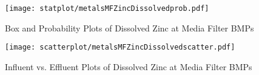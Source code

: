         \begin{figure}[hb]   %
            \centering
            \texttt{[image: statplot/metalsMFZincDissolvedprob.pdf]}
            \caption{Box and Probability Plots of Dissolved Zinc at Media Filter BMPs}
        \end{figure}         %
        
        
        \begin{figure}[hb]   %
            \centering
            \texttt{[image: scatterplot/metalsMFZincDissolvedscatter.pdf]}
            \caption{Influent vs. Effluent Plots of Dissolved Zinc at Media Filter BMPs}
        \end{figure}         %
        \clearpage
        
